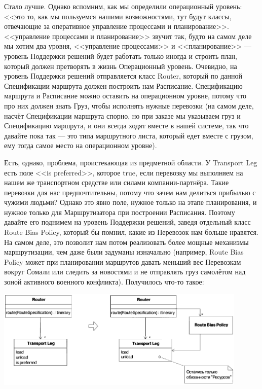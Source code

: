 \documentclass{../../text-style}
\begin{document}
Стало лучше. Однако вспомним, как мы определили операционный уровень: <<это то, как мы пользуемся нашими возможностями, тут будут классы, отвечающие за оперативное управление процессами и планирование>>. <<управление процессами и планирование>> звучит так, будто на самом деле мы хотим два уровня, <<управление процессами>> и <<планирование>> --- уровень Поддержки решений будет работать только иногда и строить план, который должен претворять в жизнь Операционный уровень. Очевидно, на уровень Поддержки решений отправляется класс Router, который по данной 
Спецификации маршрута должен построить нам Расписание. Спецификацию маршрута и Расписание можно оставить на операционном уровне, потому что про них должен знать Груз, чтобы исполнять нужные перевозки (на самом деле, насчёт Спецификации маршрута спорно, но при заказе мы указываем груз и Спецификацию маршрута, и они всегда ходят вместе в нашей системе, так что давайте пока так --- это типа маршрутного листа, который едет вместе с грузом, ему тогда самое место на операционном уровне).

Есть, однако, проблема, проистекающая из предметной области. У Transport Leg есть поле <<is preferred>>, которое true, если перевозку мы выполняем на нашем же транспортном средстве или силами компании-партнёра. Такие перевозки для нас предпочтительны, потому что зачем нам делиться прибылью с чужими людьми? Однако это явно поле, нужное только на этапе планирования, и нужное только для Маршрутизатора при построении Расписания. Поэтому давайте его поднимем на уровень Поддержки решений, заведя отдельный класс Route Bias Policy, который бы помнил, какие из Перевозок нам больше нравятся. На самом деле, это позволит нам потом реализовать более мощные механизмы маршрутизации, чем даже были задуманы изначально (например, Route Bias Policy может при планировании маршрутов давать меньший вес Перевозкам вокруг Сомали или следить за новостями и не отправлять груз самолётом над зоной активного военного конфликта). Получилось что-то такое:

\begin{center}
    \includegraphics[width=0.9\textwidth]{cargoThirdLayerRefactoring.png}
\end{center}
\end{document}
